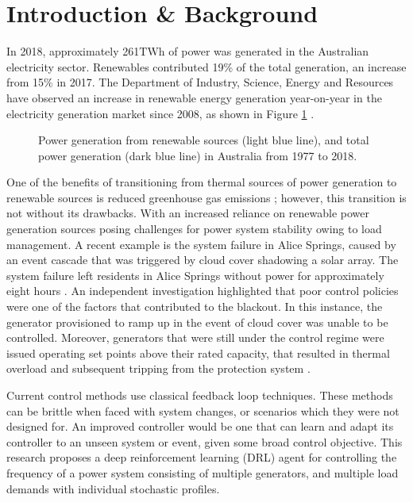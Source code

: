 \section{Introduction \& Background}
In 2018, approximately 261$\si{\tera\watt\hour}$ of power was generated in the Australian electricity sector. Renewables contributed 19\% of the total generation, an increase from 15\% in 2017. The Department of Industry, Science, Energy and Resources have observed an increase in renewable energy generation year-on-year in the electricity generation market since 2008, as shown in Figure \ref{fig:energyts} \cite{Diser2020}.\\

\begin{figure}[ht]
	\centering
	
	\caption{Power generation from renewable sources (light blue line), and total power generation (dark blue line) in Australia from 1977 to 2018.}
	\label{fig:energyts}
\end{figure}



One of the benefits of transitioning from thermal sources of power generation to renewable sources is reduced greenhouse gas emissions \cite{IPCC2012}; however, this transition is not without its drawbacks. With an increased reliance on renewable power generation sources posing challenges for power system stability owing to load management. A recent example is the system failure in Alice Springs, caused by an event cascade that was triggered by cloud cover shadowing a solar array. The system failure left residents in Alice Springs without power for approximately eight hours \cite{UCNT2019}. An independent investigation highlighted that poor control policies were one of the factors that contributed to the blackout. In this instance, the generator provisioned to ramp up in the event of cloud cover was unable to be controlled. Moreover, generators that were still under the control regime were issued operating set points above their rated capacity, that resulted in thermal overload and subsequent tripping from the protection system \cite{Wilkey2019}.

Current control methods use classical feedback loop techniques. These methods can be brittle when faced with system changes, or scenarios which they were not designed for. An improved controller would be one that can learn and adapt its controller to an unseen system or event, given some broad control objective. This research proposes a deep reinforcement learning (DRL) agent for controlling the frequency of a power system consisting of multiple generators, and multiple load demands with individual stochastic profiles.

